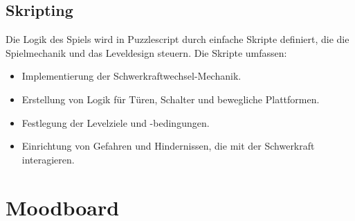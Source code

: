 \documentclass{article}
\begin{document}
\subsection{Skripting}

Die Logik des Spiels wird in Puzzlescript durch einfache Skripte definiert, die die Spielmechanik und das Leveldesign steuern.
Die Skripte umfassen:
\begin{itemize}
    \item Implementierung der Schwerkraftwechsel-Mechanik.
    \item Erstellung von Logik für Türen, Schalter und bewegliche Plattformen.
    \item Festlegung der Levelziele und -bedingungen.
    \item Einrichtung von Gefahren und Hindernissen, die mit der Schwerkraft interagieren.
\end{itemize}

\section{Moodboard}
\end{document}
